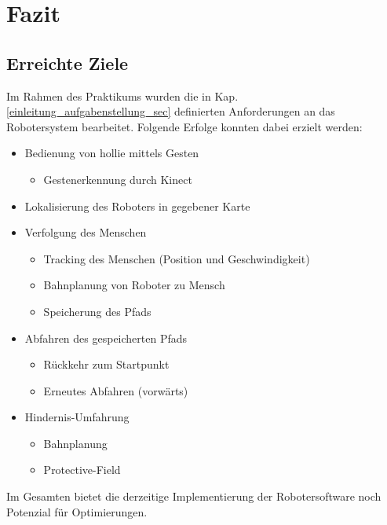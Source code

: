 
\chapter{Fazit}

\section{Erreichte Ziele}
\authorsection{\editorjulian, \editortobias}

Im Rahmen des Praktikums wurden die in Kap. \ref{einleitung_aufgabenstellung_sec} definierten Anforderungen an das Robotersystem bearbeitet.
Folgende Erfolge konnten dabei erzielt werden:

\begin{itemize}
  \item Bedienung von \gls{hollie} mittels Gesten
	\begin{itemize}
	\item Gestenerkennung durch Kinect
	\end{itemize}
  \item Lokalisierung des Roboters in gegebener Karte
  \item Verfolgung des Menschen
	\begin{itemize}
	  \item Tracking des Menschen (Position und Geschwindigkeit)
	  \item Bahnplanung von Roboter zu Mensch
	  \item Speicherung des Pfads
	\end{itemize}
  \item Abfahren des gespeicherten Pfads
	\begin{itemize}
	  \item Rückkehr zum Startpunkt
	  \item Erneutes Abfahren (vorwärts)
	\end{itemize}
  \item Hindernis-Umfahrung
	\begin{itemize}
	  \item Bahnplanung
	  \item Protective-Field
	\end{itemize}
\end{itemize}

Im Gesamten bietet die derzeitige Implementierung der Robotersoftware noch Potenzial für Optimierungen.

